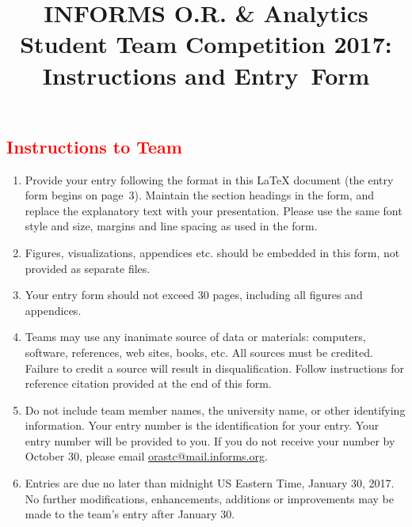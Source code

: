 \documentclass[11pt]{article} %
\begin{document}
\title{\bf INFORMS O.R. \& Analytics\\ Student Team Competition 2017:\\
Instructions and Entry~Form}

\date{\vspace*{-30pt}}

\maketitle

\subsection*{\textcolor{red}{Instructions to Team}}

{\baselineskip14.7pt

\begin{enumerate}

\item Provide your entry following the format in this LaTeX document (the entry form begins on page~3). Maintain the section headings in the form, and replace the explanatory text with your presentation. Please use the same font style and size, margins and line spacing as used in the form.

\item Figures, visualizations, appendices etc. should be embedded in this form, not provided as separate files.

\item Your entry form should not exceed 30 pages, including all figures and appendices.

\item Teams may use any inanimate source of data or materials: computers, software, references, web sites, books, etc. All sources must be credited. Failure to credit a source will result in disqualification. Follow instructions for reference citation provided at the end of this form. 

\item Do not include team member names, the university name, or other identifying information. Your entry number is the identification for your entry. Your entry number will be provided to you. If you do not receive your number by October 30, please email \underline {orastc@mail.informs.org}.

\item Entries are due no later than midnight US Eastern Time, January 30, 2017. No further modifications, enhancements, additions or improvements may be made to the team's entry after January 30. 


\end{enumerate}}
\end{document}
